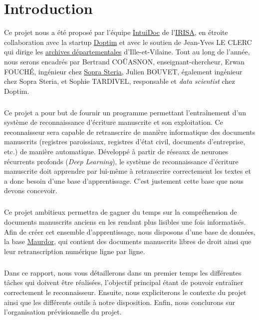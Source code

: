 \chapter{Introduction}
\setcounter{page}{1}

Ce projet nous a été proposé par l’équipe \href{https://www-intuidoc.irisa.fr/}{IntuiDoc}
de l’\href{https://www.irisa.fr/}{IRISA}, en étroite collaboration avec la startup
\href{http://www.doptim.eu}{Doptim} et avec le soutien de Jean-Yves LE CLERC qui dirige
les \href{http://archives.ille-et-vilaine.fr/fr}{archives départementales} d'Ille-et-Vilaine.
Tout au long de l’année, nous serons encadrés par Bertrand COÜASNON, enseignant-chercheur,
Erwan FOUCHÉ, ingénieur chez \href{https://www.soprasteria.com/fr}{Sopra Steria}, Julien BOUVET,
également ingénieur chez Sopra Steria, et Sophie TARDIVEL, responsable et \textit{data scientist}
chez Doptim.

\paragraph{}
Ce projet a pour but de fournir un programme permettant l’entraînement d’un système
de reconnaissance d’écriture manuscrite et son exploitation. Ce reconnaisseur sera
capable de retranscrire de manière informatique des documents manuscrits
(registres paroissiaux, registres d’état civil, documents d’entreprise, etc.)
de manière automatique. Développé à partir de réseaux de neurones récurrents profonds
(\textit{Deep Learning}), le système de reconnaissance d'écriture manuscrite doit apprendre
par lui-même à retranscrire correctement les textes et a donc besoin d’une base
d’apprentissage. C’est justement cette base que nous devons concevoir.

\paragraph{}
Ce projet ambitieux permettra de gagner du temps sur la compréhension de documents
manuscrits anciens en les rendant plus lisibles une fois informatisés.
Afin de créer cet ensemble d’apprentissage, nous disposons d’une base de données,
la base \href{http://www.maurdor-campaign.org/}{Maurdor}, qui contient des documents
manuscrits libres de droit ainsi que leur retranscription numérique ligne par ligne.

\paragraph{}
Dans ce rapport, nous vous détaillerons dans un premier temps les différentes
tâches qui doivent être réalisées, l’objectif principal étant de pouvoir
entraîner correctement le reconnaisseur. Ensuite, nous expliciterons le contexte
du projet ainsi que les différents outils à notre disposition. Enfin, nous conclurons
sur l’organisation prévisionnelle du projet.